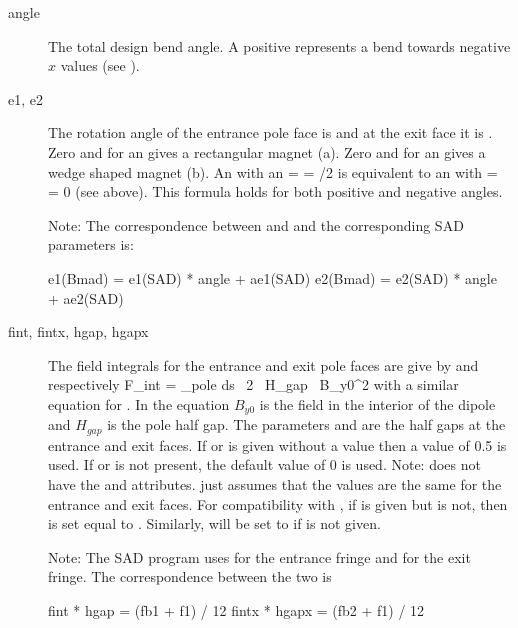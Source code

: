   \begin{description}
  \item[angle] \Newline
The total design bend angle. A positive  represents a
bend towards negative $x$ values (see ).
  \item[e1, e2] \Newline
The rotation angle of the entrance pole face is  and at the
exit face it is . Zero  and  for an 
gives a rectangular magnet  (a). Zero  and 
for an  gives a wedge shaped magnet (b).
An  with an  =  = /2 is equivalent 
to an  with  =  = 0 (see above).
This formula holds for both positive and negative angles.

Note: The correspondence between  and  and the
corresponding SAD parameters is:
\begin{example}
  e1(Bmad) =  e1(SAD) * angle + ae1(SAD)
  e2(Bmad) =  e2(SAD) * angle + ae2(SAD)
\end{example}
  \item[fint, fintx, \Newline hgap, hgapx] \Newline
The field integrals for the entrance and
exit pole faces are give by  and  respectively
\Begineq
  F_{int} = \int_{pole} \! \! ds \, 
  {2 \, H_{gap} \, B_{y0}^2}
  \label{fsbbb}
\Endeq
with a similar equation for . In the equation $B_{y0}$ is
the field in the interior of the dipole and $H_{gap}$ is the pole half
gap.  The parameters  and  are the half gaps at the
entrance and exit faces. If  or  is given without a
value then a value of 0.5 is used. If  or  is not
present, the default value of 0 is used. Note: \mad does not have the
 and  attributes. \mad just assumes that the
values are the same for the entrance and exit faces. For compatibility
with \mad, if  is given but  is not, then
 is set equal to . Similarly,  will be
set to  if  is not given.

Note: The SAD program uses  for the entrance fringe and
 for the exit fringe. The correspondence between the two is
\begin{example}
  fint  * hgap  = (fb1 + f1) / 12
  fintx * hgapx = (fb2 + f1) / 12
\end{example}


\end{description}
